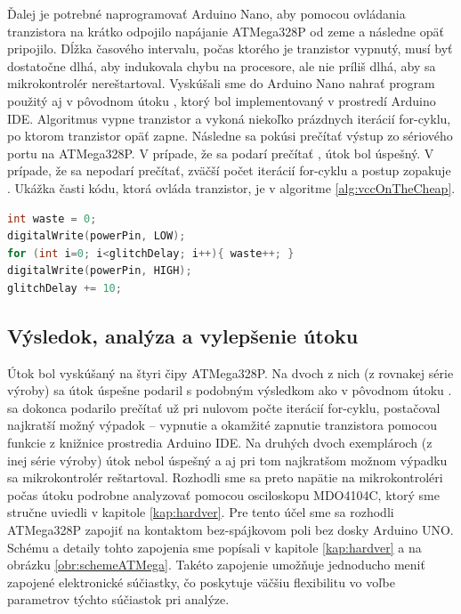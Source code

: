 Ďalej je potrebné naprogramovať Arduino Nano, aby pomocou ovládania tranzistora na krátko odpojilo napájanie ATMega328P od zeme a následne opäť pripojilo. Dĺžka časového intervalu, počas ktorého je tranzistor vypnutý, musí byť dostatočne dlhá, aby indukovala chybu na procesore, ale nie príliš dlhá, aby sa mikrokontrolér nereštartoval. Vyskúšali sme do Arduino Nano nahrať program použitý aj v pôvodnom útoku \cite{vccOnTheCheap}, ktorý bol implementovaný v prostredí Arduino IDE. Algoritmus vypne tranzistor a vykoná niekoľko prázdnych iterácií for-cyklu, po ktorom tranzistor opäť zapne. Následne sa pokúsi prečítať výstup zo sériového portu na ATMega328P. V prípade, že sa podarí prečítať , útok bol úspešný. V prípade, že sa  nepodarí prečítať, zväčší počet iterácií for-cyklu a postup zopakuje \cite{vccOnTheCheap}. Ukážka časti kódu, ktorá ovláda tranzistor, je v algoritme \ref{alg:vccOnTheCheap}.

\begin{lstlisting}[float,language=C,style=styleC,caption={Ovládanie tranzistora, ktorý spína napájanie na ATMega328P. Prevzaté zo zdrojového kódu pôvodného útoku \cite{vccOnTheCheap}.},label=alg:vccOnTheCheap]
int waste = 0;
digitalWrite(powerPin, LOW);
for (int i=0; i<glitchDelay; i++){ waste++; }                    
digitalWrite(powerPin, HIGH);
glitchDelay += 10;
\end{lstlisting}

\subsection{Výsledok, analýza a vylepšenie útoku}
Útok bol vyskúšaný na štyri čipy ATMega328P. Na dvoch z nich (z rovnakej série výroby) sa útok úspešne podaril s podobným výsledkom ako v pôvodnom útoku \cite{vccOnTheCheap}.  sa dokonca podarilo prečítať už pri nulovom počte iterácií for-cyklu, postačoval najkratší možný výpadok -- vypnutie a okamžité zapnutie tranzistora pomocou funkcie  z knižnice prostredia Arduino IDE. Na druhých dvoch exemplároch (z inej série výroby) útok nebol úspešný a aj pri tom najkratšom možnom výpadku sa mikrokontrolér reštartoval. Rozhodli sme sa preto napätie na mikrokontroléri počas útoku podrobne analyzovať pomocou osciloskopu MDO4104C, ktorý sme stručne uviedli v kapitole \ref{kap:hardver}. Pre tento účel sme sa rozhodli ATMega328P zapojiť na kontaktom bez-spájkovom poli bez dosky Arduino UNO. Schému a detaily tohto zapojenia sme popísali v kapitole \ref{kap:hardver} a na obrázku \ref{obr:schemeATMega}. Takéto zapojenie umožňuje jednoducho meniť zapojené elektronické súčiastky, čo poskytuje väčšiu flexibilitu vo voľbe parametrov týchto súčiastok pri analýze.

